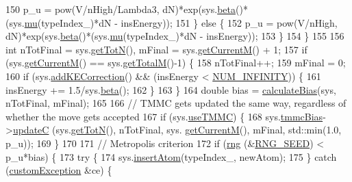 \begin{DoxyCode}
150             p\_u = pow(V/nHigh/Lambda3, dN)*exp(sys.\hyperlink{classsim_system_a3eeec9678902f8d7fce4dad6064aaf4c}{beta}()*(sys.\hyperlink{classsim_system_af1e3f5320aff976a448647244d5950d1}{mu}(typeIndex\_)*dN - insEnergy));
151         \} \textcolor{keywordflow}{else} \{
152             p\_u = pow(V/nHigh, dN)*exp(sys.\hyperlink{classsim_system_a3eeec9678902f8d7fce4dad6064aaf4c}{beta}()*(sys.\hyperlink{classsim_system_af1e3f5320aff976a448647244d5950d1}{mu}(typeIndex\_)*dN - insEnergy));
153         \}
154     \}
155 
156     \textcolor{keywordtype}{int} nTotFinal = sys.\hyperlink{classsim_system_a37dd827f4057049763351510147b9f1d}{getTotN}(), mFinal = sys.\hyperlink{classsim_system_a299fe4372e610b554eaaf5f5957b2dbc}{getCurrentM}() + 1;
157     \textcolor{keywordflow}{if} (sys.\hyperlink{classsim_system_a299fe4372e610b554eaaf5f5957b2dbc}{getCurrentM}() == sys.\hyperlink{classsim_system_aa4ad1afff101bb530e1590df05035276}{getTotalM}()-1) \{
158         nTotFinal++;
159         mFinal = 0;
160         \textcolor{keywordflow}{if} (sys.\hyperlink{classsim_system_a09c4ea670168c9f1d549d2a5120eb13c}{addKECorrection}() && (insEnergy < \hyperlink{potentials_8h_ab94ab1d09e2291d03fe92a0e24a9d33b}{NUM\_INFINITY})) \{
161             insEnergy += 1.5/sys.\hyperlink{classsim_system_a3eeec9678902f8d7fce4dad6064aaf4c}{beta}();
162         \}
163     \}
164     \textcolor{keywordtype}{double} bias = \hyperlink{system_8cpp_acfe185adf03db047fd3753c0d788e0e3}{calculateBias}(sys, nTotFinal, mFinal);
165 
166     \textcolor{comment}{// TMMC gets updated the same way, regardless of whether the move gets accepted}
167     \textcolor{keywordflow}{if} (sys.\hyperlink{classsim_system_aa474a50b6353c8897331b1ab1ce53ab1}{useTMMC}) \{
168         sys.\hyperlink{classsim_system_a13173f45a1e40a5f5a3552b0ebe15b54}{tmmcBias}->\hyperlink{classtmmc_ae067afc5b52af203b9d45f18d9737219}{updateC} (sys.\hyperlink{classsim_system_a37dd827f4057049763351510147b9f1d}{getTotN}(), nTotFinal, sys.
      \hyperlink{classsim_system_a299fe4372e610b554eaaf5f5957b2dbc}{getCurrentM}(), mFinal, std::min(1.0, p\_u));
169     \}
170 
171     \textcolor{comment}{// Metropolis criterion}
172     \textcolor{keywordflow}{if} (\hyperlink{utilities_8cpp_a0f9542af4b475ac79cb679d7a8d14db0}{rng} (&\hyperlink{global_8h_a3f4e4ea24d5a5c66feae55d1f329c884}{RNG\_SEED}) < p\_u*bias) \{
173         \textcolor{keywordflow}{try} \{
174             sys.\hyperlink{classsim_system_a0404e9435cc046d19b6bb990678ee069}{insertAtom}(typeIndex\_, newAtom);
175         \} \textcolor{keywordflow}{catch} (\hyperlink{classcustom_exception}{customException} &ce) \{

\end{DoxyCode}
